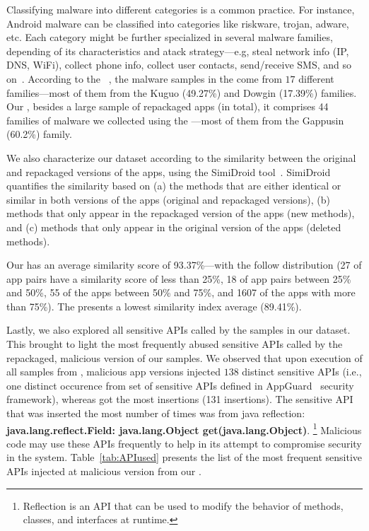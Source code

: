 Classifying malware into different categories is a common practice. For instance, Android malware can be classified into categories
like riskware, trojan, adware, etc. Each category might be further specialized in several malware families, depending of its
characteristics and atack strategy---e.g, steal network info (IP, DNS, WiFi), collect phone info,
collect user contacts, send/receive SMS, and so on~\cite{DBLP:conf/iccns/RahaliLKTGM20}.
According to the
\avt~\cite{avclass2-paper}, the malware samples in the \sds come from $17$ different families---most of them from the Kuguo (49.27\%) and Dowgin (17.39\%) families.  
Our \cds, besides a large sample of repackaged apps (\apps in total), it
comprises 44 families of malware we collected using the \avt---most
of them from the Gappusin (60.2\%) family.

We also characterize our dataset according to the similarity
between the original and repackaged versions of the apps, using the  
SimiDroid tool~\cite{DBLP:conf/trustcom/0029BK17}. SimiDroid quantifies the similarity
based on (a) the methods that are either identical or similar in both versions of the apps (original and repackaged versions),
(b) methods that only appear in the repackaged version of the apps (new methods), and (c) methods that only appear in the
original version of the apps (deleted methods).

Our \cds has an average similarity score of 93.37\%---with the follow distribution (27 of
app pairs have a similarity score of less than 25\%, 18 of app pairs
between 25\% and 50\%,  55 of the apps between 50\% and 75\%,
and 1607 of the apps with more than 75\%). The \sds presents a lowest
similarity index average (89.41\%). 


Lastly, we also explored all sensitive APIs called by the samples in our dataset. This brought to light the most frequently abused sensitive APIs called by the repackaged, malicious version of our samples. We observed that upon execution of all samples from \cds, malicious app versions injected $138$ distinct sensitive APIs (i.e., one distinct occurence from set of sensitive APIs defined in AppGuard~\cite{DBLP:conf/esorics/BackesGHMS13} security framework), whereas \sds got the most insertions (131 insertions). The sensitive API that was inserted the most number of times was from java reflection: \textbf{java.lang.reflect.Field: java.lang.Object get(java.lang.Object)}. \footnote{Reflection is an API that can be used to modify the behavior of methods, classes, and interfaces at runtime.} Malicious code may use these APIs frequently to help in its attempt to compromise security in the system. Table~\ref{tab:APIused} presents the list of the most frequent sensitive APIs injected at malicious version from our \cds.


